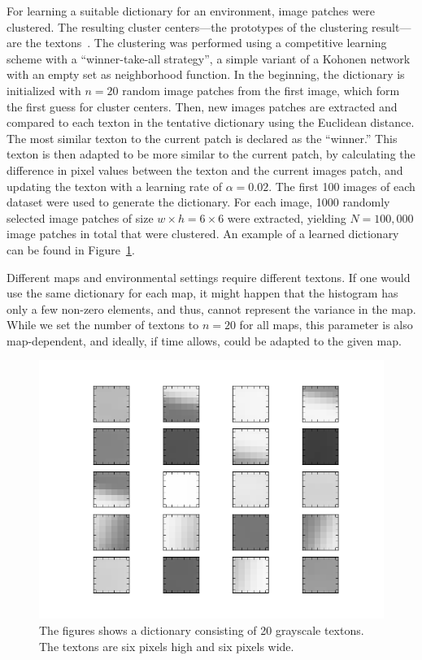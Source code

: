 \documentclass{report}
\begin{document}
For learning a suitable dictionary for an environment, image patches
were clustered. The resulting cluster centers---the prototypes of the
clustering result---are the textons~\cite{varma2003texture}. The
clustering was performed using a competitive learning scheme with a
``winner-take-all strategy'', a simple variant of a Kohonen
network~\cite{kohonen1990self} with an empty set as neighborhood
function. In the beginning, the dictionary is initialized with
$n = 20$ random image patches from the first image, which form the
first guess for cluster centers. Then, new images patches are
extracted and compared to each texton in the tentative dictionary
using the Euclidean distance. The most similar texton to the current
patch is declared as the ``winner.'' This texton is then adapted to be
more similar to the current patch, by calculating the difference in
pixel values between the texton and the current images patch, and
updating the texton with a learning rate of $\alpha = 0.02$. The first
100 images of each dataset were used to generate the dictionary. For
each image, 1000 randomly selected image patches of size
$w \times h = 6 \times 6$ were extracted, yielding $N = 100,000$ image
patches in total that were clustered. An example of a learned
dictionary can be found in Figure~\ref{fig:dictionary}.

Different maps and environmental settings require different
textons. If one would use the same dictionary for each map, it might
happen that the histogram has only a few non-zero elements, and thus,
cannot represent the variance in the map. While we set the number of
textons to $n = 20$ for all maps, this parameter is also
map-dependent, and ideally, if time allows, could be adapted to the
given map.

\begin{figure}[h!]
\begin{center}
\includegraphics[width=0.7\columnwidth]{dict}
\caption{{\label{fig:dictionary} The figures shows a dictionary
    consisting of 20 grayscale textons. The textons are six pixels
    high and six pixels wide.%
  }}
\end{center}
\end{figure}
\end{document}
